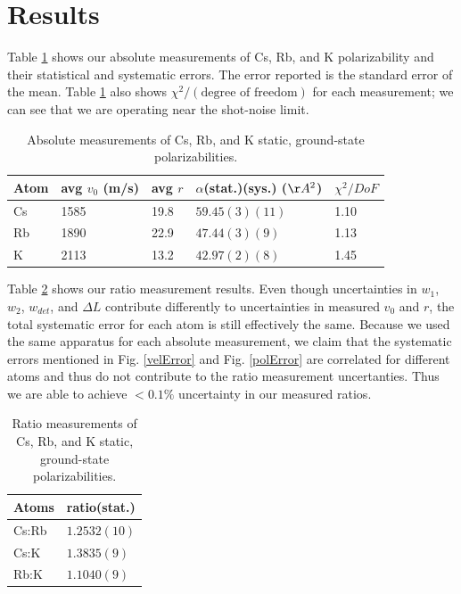 \documentclass[twocolumn,prl,showpacs,superscriptaddress]{revtex4-1}   %
\newcommand{\figref}[1]{Fig. \ref{#1}}
\newcommand{\polK}{42.97(2)(8)}
\newcommand{\polRb}{47.44(3)(9)}
\newcommand{\polCs}{59.45(3)(11)}
\newcommand{\ratRbK}{1.1040(9)}
\newcommand{\ratCsK}{1.3835(9)}
\newcommand{\ratCsRb}{1.2532(10)}
\begin{document}
\section{Results}

Table \ref{tableAbs} shows our absolute measurements of Cs, Rb, and K polarizability and their statistical and systematic errors. The error reported is the standard error of the mean. Table \ref{tableAbs} also shows $\chi^2/(\text{degree of freedom})$ for each measurement; we can see that we are operating near the shot-noise limit. 

\begingroup
\begin{table}
\caption{\label{tableAbs}Absolute measurements of Cs, Rb, and K static, ground-state polarizabilities.}
\begin{center}
\begin{tabular}{l l l l l}
\hline\hline
Atom & avg $v_0$ (m/s) & avg $r$ & $\alpha$(stat.)(sys.) ($\AA^2$) & $\chi^2/DoF$ \\
\hline
Cs & 1585 & 19.8 & $\polCs$ & 1.10 \\
Rb & 1890 & 22.9 & $\polRb$ & 1.13 \\
K  & 2113 & 13.2 & $\polK$ & 1.45 \\
\hline\hline
\end{tabular}
\end{center}
\end{table}
\endgroup

Table \ref{tableRatio} shows our ratio measurement results. 
Even though uncertainties in $w_1$, $w_2$, $w_{det}$, and $\Delta L$ contribute differently to uncertainties in measured $v_0$ and $r$, the total systematic error for each atom is still effectively the same.
Because we used the same apparatus for each absolute measurement, we claim that the systematic errors mentioned in \figref{velError} and \figref{polError} are correlated for different atoms and thus do not contribute to the ratio measurement uncertanties. 
Thus we are able to achieve $< 0.1\%$ uncertainty in our measured ratios.

\begingroup
\begin{table}
\caption{\label{tableRatio}Ratio measurements of Cs, Rb, and K static, ground-state polarizabilities.}
\begin{center}
\begin{tabular}{l l}
\hline\hline
Atoms & ratio(stat.) \\
\hline
Cs:Rb & $\ratCsRb$ \\
Cs:K  & $\ratCsK$ \\
Rb:K  & $\ratRbK$ \\
\hline\hline
\end{tabular}
\end{center}
\end{table}
\endgroup
\end{document}
